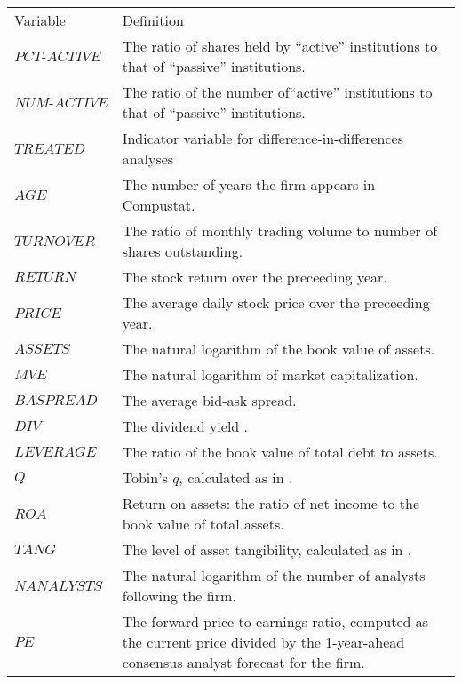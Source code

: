 \begin{center}
\begin{longtable}{l p{10cm}}
\hline
Variable & Definition\\
$PCT\text{-}ACTIVE$  & The ratio of shares held by ``active'' institutions to that of ``passive'' institutions. \\
$NUM\text{-}ACTIVE$  & The ratio of the number of``active'' institutions to that of ``passive'' institutions. \\
$TREATED$ & Indicator variable for difference-in-differences analyses\\
$AGE$ & The number of years the firm appears in Compustat.\\
$TURNOVER$ & The ratio of monthly trading volume to number of shares outstanding.\\
$RETURN$ & The stock return over the preceeding year.\\
$PRICE$ & The average daily stock price over the preceeding year.\\
$ASSETS$ & The natural logarithm of the book value of assets.\\
$MVE$ & The natural logarithm of market capitalization.\\
$BASPREAD$ & The average bid-ask spread.\\
$DIV$ & The dividend yield .\\
$LEVERAGE$ & The ratio of the book value of total debt to assets.\\
$Q$ & Tobin's $q$, calculated as in \cite{chungpruitt1994}.\\
$ROA$ & Return on assets: the ratio of net income to the book value of total assets.\\
$TANG$ & The level of asset tangibility, calculated as in \cite{almeidacampello2007}. \\
$NANALYSTS$ & The natural logarithm of the number of analysts following the firm.	\\					
$PE$ & The forward price-to-earnings ratio, computed as the current price divided by the 1-year-ahead consensus analyst forecast for the firm.
\end{longtable}
\end{center}
